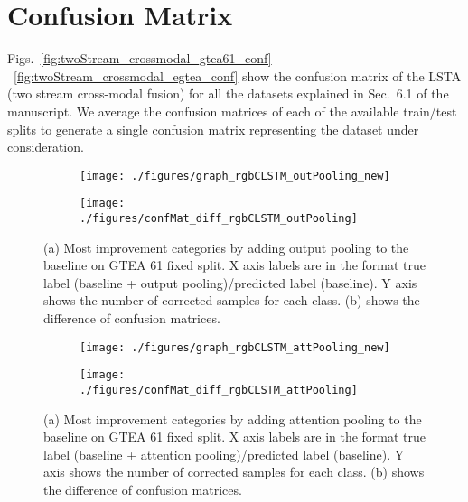 \documentclass[10pt,twocolumn,letterpaper]{article}
\begin{document}
	
	
	\section{Confusion Matrix}
	
	Figs.~\ref{fig:twoStream_crossmodal_gtea61_conf}~-~\ref{fig:twoStream_crossmodal_egtea_conf} show the confusion matrix of the LSTA (two stream cross-modal fusion) for all the datasets explained in Sec.~6.1 of the manuscript. We average the confusion matrices of each of the available train/test splits to generate a single confusion matrix representing the dataset under consideration.

	

	
	
	
		\begin{figure*}[t]
		\centering
		\begin{subfigure}[b]{0.45\textwidth}
			\texttt{[image: ./figures/graph\_rgbCLSTM\_outPooling\_new]}
			\caption{}
			\label{fig:base+outPoolingImp}
		\end{subfigure} \hspace{4mm}
		\begin{subfigure}[b]{0.45\textwidth}
			\texttt{[image: ./figures/confMat\_diff\_rgbCLSTM\_outPooling]}
			\label{fig:base+outPoolingConf}
			\caption{}
		\end{subfigure}
		\caption{(a) Most improvement categories by adding output pooling to the baseline on GTEA 61 fixed split. X axis labels are in the format true label (baseline + output pooling)/predicted label (baseline). Y axis shows the number of corrected samples for each class. (b) shows the difference of confusion matrices.}
		\label{fig:base+outPooling}
	\end{figure*}
	
	\begin{figure*}[t]
		\centering
		\begin{subfigure}[b]{0.45\textwidth}
			\texttt{[image: ./figures/graph\_rgbCLSTM\_attPooling\_new]}
			\label{fig:base+attPoolingImp}
			\caption{}
		\end{subfigure} \hspace{4mm}
		\begin{subfigure}[b]{0.45\textwidth}
			\texttt{[image: ./figures/confMat\_diff\_rgbCLSTM\_attPooling]}
			\label{fig:base+attPoolingConf}
			\caption{}
		\end{subfigure}
		\caption{(a) Most improvement categories by adding attention pooling to the baseline on GTEA 61 fixed split. X axis labels are in the format true label (baseline + attention pooling)/predicted label (baseline). Y axis shows the number of corrected samples for each class. (b) shows the difference of confusion matrices.}
		\label{fig:base+attPooling}
	\end{figure*}
	
\end{document}
